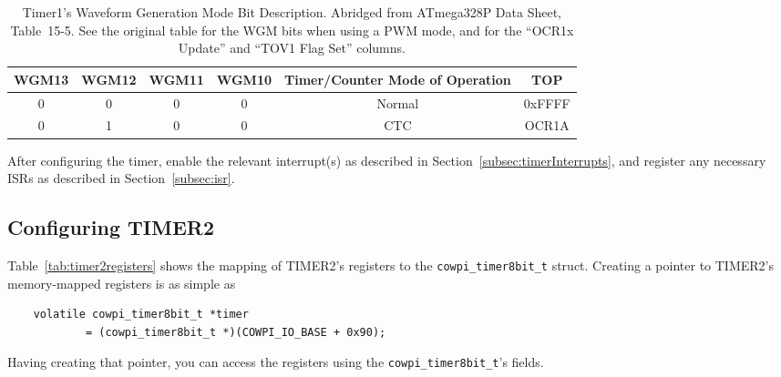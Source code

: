 \begin{table}[h]
    \centering \small
    \begin{tabular}{|c|c|c|c|c|c|} \hline
    \textbf{WGM13}  & \textbf{WGM12}    & \textbf{WGM11}    & \textbf{WGM10}    & \textbf{Timer/Counter Mode of Operation}  & TOP    \\ \hline\hline
    0               & 0                 & 0                 & 0                 & Normal                                    & 0xFFFF \\ \hline
    0               & 1                 & 0                 & 0                 & CTC                                       & OCR1A  \\ \hline
    \end{tabular}
    \caption{Timer1's Waveform Generation Mode Bit Description. \tiny Abridged from ATmega328P Data Sheet, Table~15\mbox{-}5.\cite{ATmega328P} See the original table for the WGM bits when using a PWM mode, and for the ``OCR1x Update'' and ``TOV1 Flag Set'' columns. \label{tab:timer1wgm}}
\end{table}

After configuring the timer, enable the relevant interrupt(s) as described in Section~\ref{subsec:timerInterrupts}, and register any necessary ISRs as described in Section~\ref{subsec:isr}.

\subsection{Configuring TIMER2}
Table~\ref{tab:timer2registers} shows the mapping of TIMER2's registers to the \lstinline{cowpi_timer8bit_t} struct.
Creating a pointer to TIMER2's memory-mapped registers is as simple as
\begin{lstlisting}
    volatile cowpi_timer8bit_t *timer
            = (cowpi_timer8bit_t *)(COWPI_IO_BASE + 0x90);
\end{lstlisting}
Having creating that pointer, you can access the registers using the \lstinline{cowpi_timer8bit_t}'s fields.

